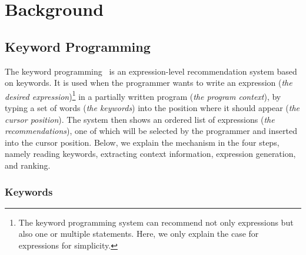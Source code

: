 \documentclass[PRO,english]{ipsj}
\begin{document}


\section{Background}\label{sec:background}
\subsection{Keyword Programming}
The keyword programming~\cite{KeywordProgramming} is an expression-level recommendation system based on keywords.  It is used when the programmer wants to write an expression (\emph{the desired expression})\footnote{The keyword programming system can recommend not only expressions but also one or multiple statements.  Here, we only explain the case for expressions for simplicity.} in a partially written program (\emph{the program context}), by typing a set of words (\emph{the keywords}) into the position where it should appear (\emph{the cursor position}).  The system then shows an ordered list of expressions (\emph{the recommendations}), one of which will be selected by the programmer and inserted into the cursor position. Below, we explain the mechanism in the four steps, namely reading keywords, extracting context information, expression generation, and ranking. 

\subsubsection{Keywords}
\end{document}

